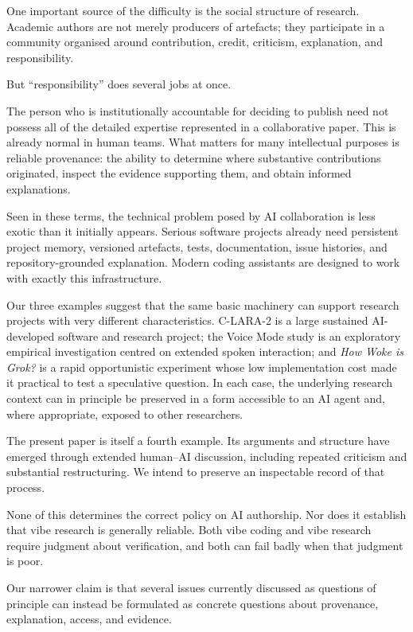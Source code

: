 One important source of the difficulty is the social structure of research. Academic authors are not merely producers of artefacts; they participate in a community organised around contribution, credit, criticism, explanation, and responsibility.

But ``responsibility'' does several jobs at once.

The person who is institutionally accountable for deciding to publish need not possess all of the detailed expertise represented in a collaborative paper. This is already normal in human teams. What matters for many intellectual purposes is reliable provenance: the ability to determine where substantive contributions originated, inspect the evidence supporting them, and obtain informed explanations.

Seen in these terms, the technical problem posed by AI collaboration is less exotic than it initially appears. Serious software projects already need persistent project memory, versioned artefacts, tests, documentation, issue histories, and repository-grounded explanation. Modern coding assistants are designed to work with exactly this infrastructure.

Our three examples suggest that the same basic machinery can support research projects with very different characteristics. C-LARA-2 is a large sustained AI-developed software and research project; the Voice Mode study is an exploratory empirical investigation centred on extended spoken interaction; and \emph{How Woke is Grok?} is a rapid opportunistic experiment whose low implementation cost made it practical to test a speculative question. In each case, the underlying research context can in principle be preserved in a form accessible to an AI agent and, where appropriate, exposed to other researchers.

The present paper is itself a fourth example. Its arguments and structure have emerged through extended human--AI discussion, including repeated criticism and substantial restructuring. We intend to preserve an inspectable record of that process.

None of this determines the correct policy on AI authorship. Nor does it establish that vibe research is generally reliable. Both vibe coding and vibe research require judgment about verification, and both can fail badly when that judgment is poor.

Our narrower claim is that several issues currently discussed as questions of principle can instead be formulated as concrete questions about provenance, explanation, access, and evidence.

